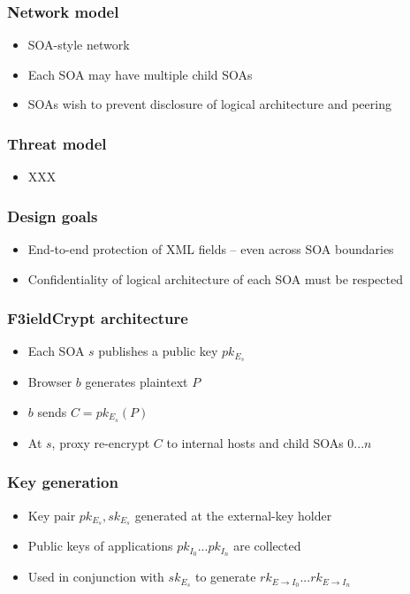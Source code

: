 \documentclass{beamer}
\begin{document}
\begin{frame}
\frametitle{Network model}
\begin{itemize}
\item SOA-style network
\item Each SOA may have multiple child SOAs
\item SOAs wish to prevent disclosure of logical architecture and peering 
\end{itemize}
\end{frame}

\begin{frame}
\frametitle{Threat model}
\begin{itemize}
\item XXX
\end{itemize}
\end{frame}

\begin{frame}
\frametitle{Design goals}
\begin{itemize}
\item End-to-end protection of XML fields -- even across SOA boundaries
\item Confidentiality of logical architecture of each SOA must be respected
\end{itemize}
\end{frame}

\begin{frame}
\frametitle{F3ieldCrypt architecture}
\begin{itemize}
\item Each SOA $s$ publishes a public key $pk_{E_s}$
\item Browser $b$ generates plaintext $P$
\item $b$ sends $C = pk_{E_s}(P)$ 
\item At $s$, proxy re-encrypt $C$ to internal hosts and child SOAs $0...n$ 
\end{itemize}
\end{frame}

\begin{frame}
\frametitle{Key generation}
\begin{itemize}
\item Key pair $pk_{E_s}, sk_{E_s}$ generated at the \alert{external-key holder}
\item Public keys of applications $pk_{I_0}...pk_{I_n}$ are collected
\item Used in conjunction with $sk_{E_s}$ to generate $rk_{E \to I_0}...rk_{E
\to I_n}$
\end{itemize}
\end{frame}
\end{document}
